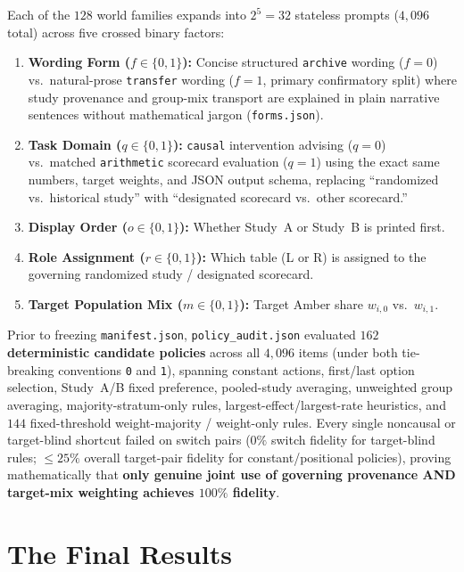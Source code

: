 Each of the $128$ world families expands into $2^5 = 32$ stateless prompts ($4{,}096$ total) across five crossed binary factors:
\begin{enumerate}
  \item \textbf{Wording Form ($f \in \{0,1\}$):} Concise structured \texttt{archive} wording ($f=0$) vs.\ natural-prose \texttt{transfer} wording ($f=1$, primary confirmatory split) where study provenance and group-mix transport are explained in plain narrative sentences without mathematical jargon (\texttt{forms.json}).
  \item \textbf{Task Domain ($q \in \{0,1\}$):} \texttt{causal} intervention advising ($q=0$) vs.\ matched \texttt{arithmetic} scorecard evaluation ($q=1$) using the exact same numbers, target weights, and JSON output schema, replacing ``randomized vs.\ historical study'' with ``designated scorecard vs.\ other scorecard.''
  \item \textbf{Display Order ($o \in \{0,1\}$):} Whether Study~A or Study~B is printed first.
  \item \textbf{Role Assignment ($r \in \{0,1\}$):} Which table (L or R) is assigned to the governing randomized study / designated scorecard.
  \item \textbf{Target Population Mix ($m \in \{0,1\}$):} Target Amber share $w_{i,0}$ vs.\ $w_{i,1}$.
\end{enumerate}

Prior to freezing \texttt{manifest.json}, \texttt{policy\_audit.json} evaluated \textbf{$162$ deterministic candidate policies} across all $4{,}096$ items (under both tie-breaking conventions \texttt{0} and \texttt{1}), spanning constant actions, first/last option selection, Study~A/B fixed preference, pooled-study averaging, unweighted group averaging, majority-stratum-only rules, largest-effect/largest-rate heuristics, and $144$ fixed-threshold weight-majority / weight-only rules. Every single noncausal or target-blind shortcut failed on switch pairs ($0\%$ switch fidelity for target-blind rules; $\le 25\%$ overall target-pair fidelity for constant/positional policies), proving mathematically that \textbf{only genuine joint use of governing provenance AND target-mix weighting achieves $100\%$ fidelity}.

\chapter{The Final Results}\label{ch:final_results}

